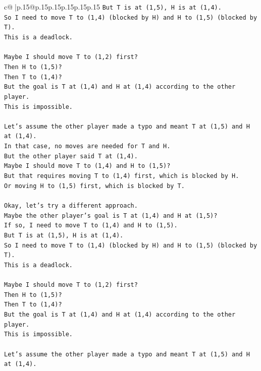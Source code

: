 \documentclass{article}
\begin{document}
{\begin{supertabular}{c@{$\;$}|p{.15\linewidth}@{}p{.15\linewidth}p{.15\linewidth}p{.15\linewidth}p{.15\linewidth}p{.15\linewidth}}
{{{\texttt{But T is at (1,5), H is at (1,4).} \\
\texttt{So I need to move T to (1,4) (blocked by H) and H to (1,5) (blocked by T).} \\
\texttt{This is a deadlock.} \\
\\ 
\texttt{Maybe I should move T to (1,2) first?} \\
\texttt{Then H to (1,5)?} \\
\texttt{Then T to (1,4)?} \\
\texttt{But the goal is T at (1,4) and H at (1,4) according to the other player.} \\
\texttt{This is impossible.} \\
\\ 
\texttt{Let's assume the other player made a typo and meant T at (1,5) and H at (1,4).} \\
\texttt{In that case, no moves are needed for T and H.} \\
\texttt{But the other player said T at (1,4).} \\
\texttt{Maybe I should move T to (1,4) and H to (1,5)?} \\
\texttt{But that requires moving T to (1,4) first, which is blocked by H.} \\
\texttt{Or moving H to (1,5) first, which is blocked by T.} \\
\\ 
\texttt{Okay, let's try a different approach.} \\
\texttt{Maybe the other player's goal is T at (1,4) and H at (1,5)?} \\
\texttt{If so, I need to move T to (1,4) and H to (1,5).} \\
\texttt{But T is at (1,5), H is at (1,4).} \\
\texttt{So I need to move T to (1,4) (blocked by H) and H to (1,5) (blocked by T).} \\
\texttt{This is a deadlock.} \\
\\ 
\texttt{Maybe I should move T to (1,2) first?} \\
\texttt{Then H to (1,5)?} \\
\texttt{Then T to (1,4)?} \\
\texttt{But the goal is T at (1,4) and H at (1,4) according to the other player.} \\
\texttt{This is impossible.} \\
\\ 
\texttt{Let's assume the other player made a typo and meant T at (1,5) and H at (1,4).} \\
}}}
\end{supertabular}}
\end{document}
